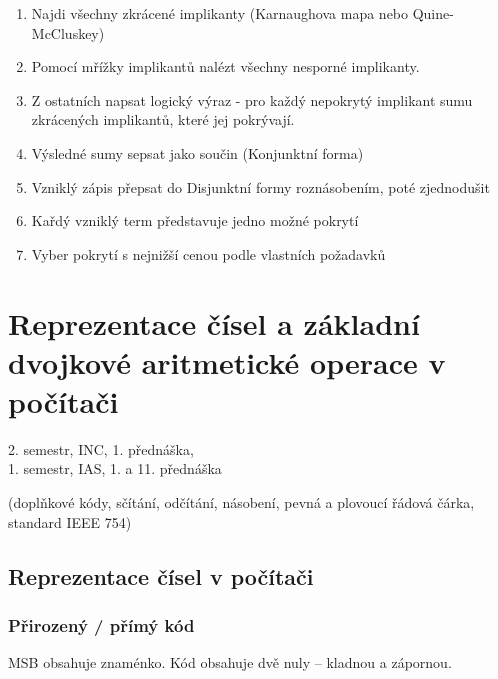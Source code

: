 \documentclass[a4paper, 11pt]{report}
\begin{document}
\begin{enumerate}
	\item Najdi všechny zkrácené implikanty (Karnaughova mapa nebo Quine-McCluskey)
	\item Pomocí mřížky implikantů nalézt všechny nesporné implikanty.
	\item Z ostatních napsat logický výraz - pro každý nepokrytý implikant sumu zkrácených implikantů, které jej pokrývají.
	\item Výsledné sumy sepsat jako součin (Konjunktní forma)
	\item Vzniklý zápis přepsat do Disjunktní formy roznásobením, poté zjednodušit
	\item Kařdý vzniklý term představuje jedno možné pokrytí
	\item Vyber pokrytí s nejnižší cenou podle vlastních požadavků
\end{enumerate}

















\setcounter{chapter}{8}
\chapter{Reprezentace čísel a základní dvojkové aritmetické operace v počítači} \label{cha:9}

2. semestr, INC, 1. přednáška,\\
1. semestr, IAS, 1. a 11. přednáška

(doplňkové kódy, sčítání, odčítání, násobení, pevná a plovoucí řádová čárka, standard IEEE 754)

\section{Reprezentace čísel v počítači}

\subsection{Přirozený / přímý kód}

MSB obsahuje znaménko. Kód obsahuje dvě nuly -- kladnou a zápornou.
\end{document}
